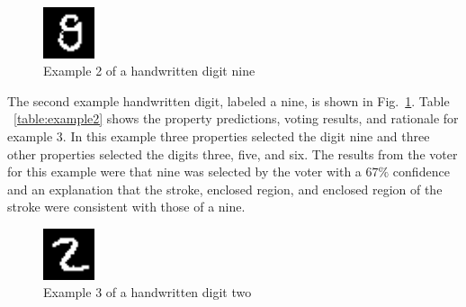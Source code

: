 \documentclass[conference]{IEEEtran}
\begin{document}
 \begin{figure}[htbp]
\centerline{\includegraphics[width=15mm]{./digit-images/9-9.png}}
\caption{Example 2 of a handwritten digit nine}
\label{example2}
\end{figure}


The second example handwritten digit,  labeled a nine, is shown in Fig.~\ref{example2}.  Table ~\ref{table:example2} shows the property predictions, voting results, and rationale for example 3.  In this example three properties selected the digit nine and three other properties selected the digits three, five, and six.  The results from the voter for this example were that nine was selected by the voter with a $67\%$ confidence and an explanation that the stroke,  enclosed region, and enclosed region of the stroke were consistent with those of a nine.

 \begin{figure}[htbp]
\centerline{\includegraphics[width=15mm]{./digit-images/2-4.png}}
\caption{Example 3 of a handwritten digit two}
\label{example3}
\end{figure}
\end{document}

